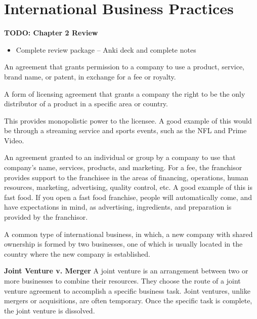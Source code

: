 \section{International Business Practices}

\textbf{TODO: Chapter 2 Review}
\begin{itemize}
    \item Complete review package -- Anki deck and complete notes
\end{itemize}

\begin{definition}
    An agreement that grants permission to a company to use a product, service,
    brand name, or patent, in exchange for a fee or royalty.
\end{definition}

\begin{definition}
    A form of licensing agreement that grants a company the right
    to be the only distributor of a product in a specific area or country.
\end{definition}

This provides monopolistic power to the licensee. 
A good example of this would be through a streaming service 
and sports events, such as the NFL and Prime Video. \\

\begin{definition}[Franchise]
    An agreement granted to an individual or group by a company to use that 
    company's name, services, products, and marketing.
    For a fee, the franchisor provides support to the franchisee in the areas of 
    financing, operations, human resources, marketing, advertising, quality control, etc.
    A good example of this is fast food. If you open a fast food franchise, people will automatically
    come, and have expectations in mind, as advertising, ingredients, and preparation is provided by
    the franchisor.
\end{definition}

\begin{definition}
    A common type of international business, in which, a new company with shared ownership is formed 
    by two businesses, one of which is usually located in the country where the new company is established.
\end{definition}

\textbf{Joint Venture v. Merger}
A joint venture is an arrangement between two or more businesses to combine their resources. 
They choose the route of a joint venture agreement to accomplish a specific business task. 
Joint ventures, unlike mergers or acquisitions, are often temporary. Once the specific task is 
complete, the joint venture is dissolved. \\

